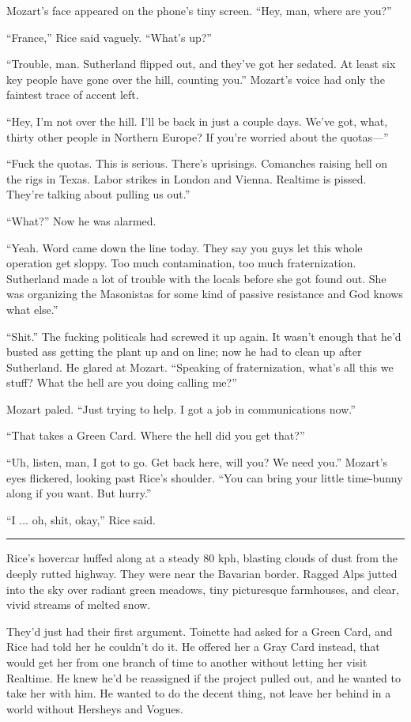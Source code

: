 Mozart's face appeared on the phone's tiny screen. ``Hey, man, where are you?''

``France,'' Rice said vaguely. ``What's up?''

``Trouble, man. Sutherland flipped out, and they've got her sedated. At least six key people have gone over the hill, counting you.'' Mozart's voice had only the faintest trace of accent left.

``Hey, I'm not over the hill. I'll be back in just a couple days. We've got, what, thirty other people in Northern Europe? If you're worried about the quotas—''

``Fuck the quotas. This is serious. There's uprisings. Comanches raising hell on the rigs in Texas. Labor strikes in London and Vienna. Realtime is pissed. They're talking about pulling us out.''

``What?'' Now he was alarmed.

``Yeah. Word came down the line today. They say you guys let this whole operation get sloppy. Too much contamination, too much fraternization. Sutherland made a lot of trouble with the locals before she got found out. She was organizing the Masonistas for some kind of passive resistance and God knows what else.''

``Shit.'' The fucking politicals had screwed it up again. It wasn't enough that he'd busted ass getting the plant up and on line; now he had to clean up after Sutherland. He glared at Mozart. ``Speaking of fraternization, what's all this we stuff? What the hell are you doing calling me?''

Mozart paled. ``Just trying to help. I got a job in communications now.''

``That takes a Green Card. Where the hell did you get that?''

``Uh, listen, man, I got to go. Get back here, will you? We need you.'' Mozart's eyes flickered, looking past Rice's shoulder. ``You can bring your little time-bunny along if you want. But hurry.''

``I ... oh, shit, okay,'' Rice said.

\fancybreak{* * *}

Rice's hovercar huffed along at a steady 80 kph, blasting clouds of dust from the deeply rutted highway. They were near the Bavarian border. Ragged Alps jutted into the sky over radiant green meadows, tiny picturesque farmhouses, and clear, vivid streams of melted snow.

They'd just had their first argument. Toinette had asked for a Green Card, and Rice had told her he couldn't do it. He offered her a Gray Card instead, that would get her from one branch of time to another without letting her visit Realtime. He knew he'd be reassigned if the project pulled out, and he wanted to take her with him. He wanted to do the decent thing, not leave her behind in a world without Hersheys and Vogues.

